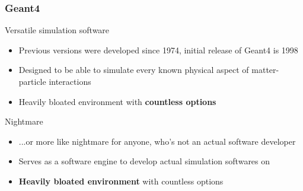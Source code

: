 \begin{frame}
\frametitle{Geant4}

\begin{block}{Versatile simulation software}
	\begin{itemize}
		\item Previous versions were developed since 1974, initial release of Geant4 is 1998
		\item Designed to be able to simulate every known physical aspect of matter-particle interactions
		\item Heavily bloated environment with \textbf{countless options}
	\end{itemize}
\end{block}

\pause

\begin{alertblock}{Nightmare}
	\begin{itemize}
		\item ...or more like nightmare for anyone, who's not an actual software developer
		\item Serves as a software engine to develop actual simulation softwares on
		\item \textbf{Heavily bloated environment} with countless options
	\end{itemize}
\end{alertblock}


\end{frame}